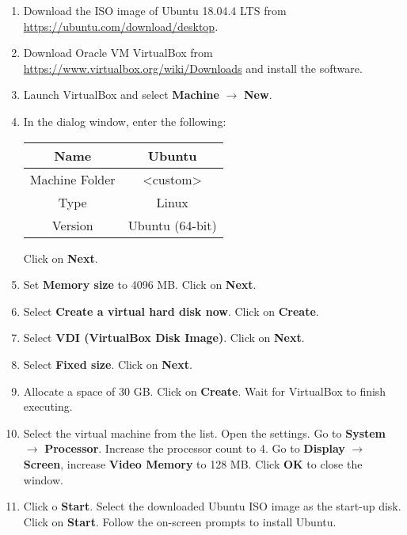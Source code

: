 \documentclass[11pt,letterpaper,titlepage]{article}
\begin{document}
\begin{enumerate}
    
    \item Download the ISO image of Ubuntu 18.04.4 LTS from \url{https://ubuntu.com/download/desktop}.
    
    \item Download Oracle VM VirtualBox from \url{https://www.virtualbox.org/wiki/Downloads} and install the software.
    
    \item Launch VirtualBox and select \textbf{Machine} $\rightarrow$ \textbf{New}. 
    
    \item In the dialog window, enter the following:
    
    \begin{table}[ht]
    \centering
    \begin{tabular}{@{}cc@{}}
    \toprule
    Name           & Ubuntu                          \\ \midrule
    Machine Folder & \textless{}custom\textgreater{} \\ \midrule
    Type           & Linux                           \\ \midrule
    Version        & Ubuntu (64-bit)                 \\ \bottomrule
    \end{tabular}
    \end{table}
    
    Click on \textbf{Next}.
    
    \item Set \textbf{Memory size} to 4096 MB. Click on \textbf{Next}.
    
    \item Select \textbf{Create a virtual hard disk now}. Click on \textbf{Create}.
    
    \item Select \textbf{VDI (VirtualBox Disk Image)}. Click on \textbf{Next}.
    
    \item Select \textbf{Fixed size}. Click on \textbf{Next}.
    
    \item Allocate a space of 30 GB. Click on \textbf{Create}. Wait for VirtualBox to finish executing.
    
    \item Select the virtual machine from the list. Open the settings. Go to \textbf{System} $\rightarrow$ \textbf{Processor}. Increase the processor count to 4. Go to \textbf{Display} $\rightarrow$ \textbf{Screen}, increase \textbf{Video Memory} to 128 MB. Click \textbf{OK} to close the window.
    
    \item Click o \textbf{Start}. Select the downloaded Ubuntu ISO image as the start-up disk. Click on \textbf{Start}. Follow the on-screen prompts to install Ubuntu.
    
    
\end{enumerate}
\end{document}
